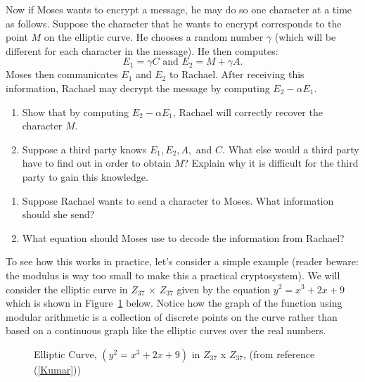 Now if Moses wants to encrypt a message, he may do so one character at a time as follows. Suppose the character that he wants to encrypt corresponds to the point $M$ on the elliptic curve.   He chooses a random number $\gamma$ (which will be different for each character in the message). He then computes:
\[
E_1=\gamma C \text{   and   }
E_2 = M +  \gamma A. 
\]
Moses then communicates $E_1$ and $E_2$ to  Rachael.  After receiving this information, Rachael may decrypt the message by computing $E_2 - \alpha E_1$.

\begin{exercise}{}
\begin{enumerate}[a]
\item
Show that by computing $E_2 - \alpha E_1$, Rachael will correctly recover  the character $M$.
\item
Suppose a third party knows $E_1, E_2, A,$ and $C$. What else would a third party have to find out in order to obtain $M$?  Explain why it is difficult for the third party to gain this knowledge.
\end{enumerate}
\end{exercise}

\begin{exercise}{}
\begin{enumerate}[a]
\item
Suppose Rachael wants to send a character to Moses.  What information should she send?
\item
What equation should Moses use to decode the information from Rachael?
\end{enumerate}
\end{exercise}

To see how this works in practice, let's consider a simple example (reader beware: the modulus is way too small to make this a practical cryptosystem). We will consider the elliptic curve in $Z_{37}$ $\times$ $Z_{37}$ given by the equation $y^2 = x^3 + 2x + 9$ which is shown in Figure~\ref{fig:DH:DHKE_11} below. Notice how the graph of the function using modular arithmetic is a collection of discrete points on the curve rather than based on a continuous graph like the elliptic curves over the real numbers.

\begin{figure}[htbp]
	  \caption{\label{fig:DH:DHKE_11} Elliptic Curve, $(y^2 = x^3 + 2x + 9)$ in $Z_{37}$ x $Z_{37}$, (from reference (\ref{Kumar}))}
\end{figure}

